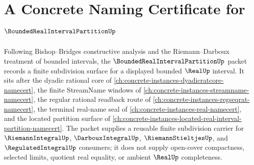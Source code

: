 \chapter{A Concrete Naming Certificate for $\BoundedRealIntervalPartitionUp$}
\label{ch:concrete-instances-bounded-real-interval-partition-namecert}

Following Bishop--Bridges constructive analysis and the Riemann--Darboux treatment of bounded intervals, the $\BoundedRealIntervalPartitionUp$ packet records a finite subdivision surface for a displayed bounded $\RealUp$ interval. It sits after the dyadic rational core of \autoref{ch:concrete-instances-dyadicratcore-namecert}, the finite StreamName windows of \autoref{ch:concrete-instances-streamname-namecert}, the regular rational readback route of \autoref{ch:concrete-instances-regseqrat-namecert}, the terminal real-name seal of \autoref{ch:concrete-instances-real-namecert}, and the located partition surface of \autoref{ch:concrete-instances-located-real-interval-partition-namecert}. The packet supplies a reusable finite subdivision carrier for $\RiemannIntegralUp$, $\DarbouxIntegralUp$, $\RiemannStieltjesUp$, and $\RegulatedIntegralUp$ consumers; it does not supply open-cover compactness, selected limits, quotient real equality, or ambient $\RealUp$ completeness.


